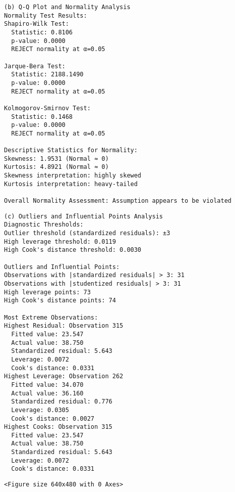 \documentclass[8pt, twocolumn]{extarticle}
\begin{document}
    \begin{Verbatim}[commandchars=\\\{\}]
(b) Q-Q Plot and Normality Analysis
Normality Test Results:
Shapiro-Wilk Test:
  Statistic: 0.8106
  p-value: 0.0000
  REJECT normality at α=0.05

Jarque-Bera Test:
  Statistic: 2188.1490
  p-value: 0.0000
  REJECT normality at α=0.05

Kolmogorov-Smirnov Test:
  Statistic: 0.1468
  p-value: 0.0000
  REJECT normality at α=0.05

Descriptive Statistics for Normality:
Skewness: 1.9531 (Normal ≈ 0)
Kurtosis: 4.8921 (Normal ≈ 0)
Skewness interpretation: highly skewed
Kurtosis interpretation: heavy-tailed

Overall Normality Assessment: Assumption appears to be violated
    \end{Verbatim}
    \begin{Verbatim}[commandchars=\\\{\}]
(c) Outliers and Influential Points Analysis
Diagnostic Thresholds:
Outlier threshold (standardized residuals): ±3
High leverage threshold: 0.0119
High Cook's distance threshold: 0.0030

Outliers and Influential Points:
Observations with |standardized residuals| > 3: 31
Observations with |studentized residuals| > 3: 31
High leverage points: 73
High Cook's distance points: 74

Most Extreme Observations:
Highest Residual: Observation 315
  Fitted value: 23.547
  Actual value: 38.750
  Standardized residual: 5.643
  Leverage: 0.0072
  Cook's distance: 0.0331
Highest Leverage: Observation 262
  Fitted value: 34.070
  Actual value: 36.160
  Standardized residual: 0.776
  Leverage: 0.0305
  Cook's distance: 0.0027
Highest Cooks: Observation 315
  Fitted value: 23.547
  Actual value: 38.750
  Standardized residual: 5.643
  Leverage: 0.0072
  Cook's distance: 0.0331
    \end{Verbatim}
    \begin{Verbatim}[commandchars=\\\{\}]
<Figure size 640x480 with 0 Axes>
    \end{Verbatim}
\end{document}
